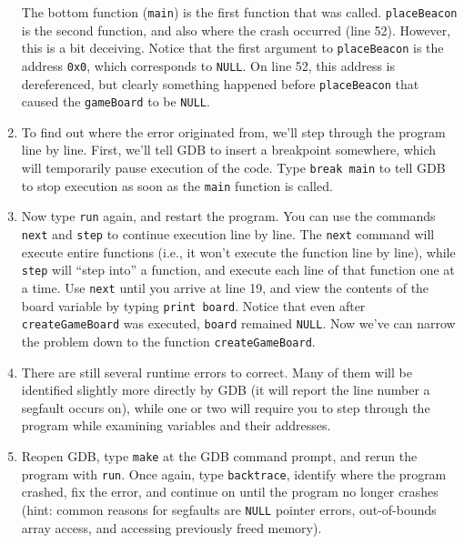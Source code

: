 \documentclass[12pt]{scrartcl}
\begin{document}
\begin{enumerate}
	The bottom function (\texttt{main}) is the first function that was called.  
	\texttt{placeBeacon} is the second function, and also where the crash 
	occurred (line 52).  However, this is a bit deceiving.  Notice that the first 
	argument to \texttt{placeBeacon} is the address \texttt{0x0}, which corresponds
	to \texttt{NULL}.  On line 52, this address is dereferenced, but clearly 
	something happened before \texttt{placeBeacon} that caused the 
	\texttt{gameBoard} to be \texttt{NULL}.
  \item To find out where the error originated from, we'll step through the program 
	line by line.  First, we'll tell GDB to insert a breakpoint somewhere, which 
	will temporarily pause execution of the code.  Type \texttt{break main} to tell 
	GDB to stop execution as soon as the \texttt{main} function is called.
  \item Now type \texttt{run} again, and restart the program.  You can use the commands 
	\texttt{next} and \texttt{step} to continue execution 
	line by line.  The \texttt{next} command will execute entire functions 
	(i.e., it won't execute the function line by line), while 
	\texttt{step} will ``step into'' a function, and execute each line of that 
	function one at a time.  Use \texttt{next} until you arrive at line 19, 
	and view the contents of the board variable by typing \texttt{print board}.  Notice 
	that even after \texttt{createGameBoard} was executed, \texttt{board} 
	remained \texttt{NULL}.  Now we've can narrow the problem down 
	to the function \texttt{createGameBoard}. 
  \item There are still several runtime errors to correct.  Many of them will be identified 
	slightly more directly by GDB (it will report the line number a segfault occurs on), 
	while one or two will require you to step through the program while examining 
	variables and their addresses.
  \item Reopen GDB, type \texttt{make} at the GDB command prompt, and 
	rerun the program with \texttt{run}.  Once again, type \texttt{backtrace}, 
	identify where the program crashed, fix the error, and continue on until the 
	program no longer crashes (hint: common reasons for segfaults are \texttt{NULL} 
	pointer errors,  out-of-bounds array access, and accessing previously freed memory).
\end{enumerate}
\end{document}
